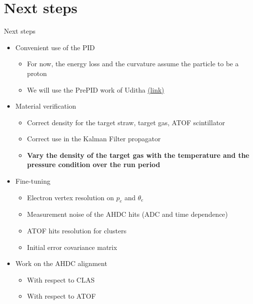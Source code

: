 \documentclass[10pt,aspectratio=43]{beamer}
\begin{document}
\section{Next steps}
\begin{frame}{Next steps}
    \begin{itemize}
        \item Convenient use of the PID
            \begin{itemize}
                \item For now, the energy loss and the curvature assume the particle to be a proton
                \item We will use the PrePID work of Uditha \href{https://indico.jlab.org/event/1017/\#73-alert-ai-particle-identific}{(\underline{link}) {\scriptsize \faExternalLink*}}
            \end{itemize}
        \item Material verification
            \begin{itemize}
                \item Correct density for the target straw, target gas, ATOF scintillator
                \item Correct use in the Kalman Filter propagator
                \item \textbf{Vary the density of the target gas with the temperature and the pressure condition over the run period}
            \end{itemize}
        \item Fine-tuning
            \begin{itemize}
                \item Electron vertex resolution on $p_e$ and $\theta_e$
                \item Measurement noise of the AHDC hits (ADC and time dependence)
                \item ATOF hits resolution for clusters
                \item Initial error covariance matrix
            \end{itemize}
        \item Work on the AHDC alignment
            \begin{itemize}
                \item With respect to CLAS
                \item With respect to ATOF
            \end{itemize}
    \end{itemize}


\end{frame}
\end{document}

